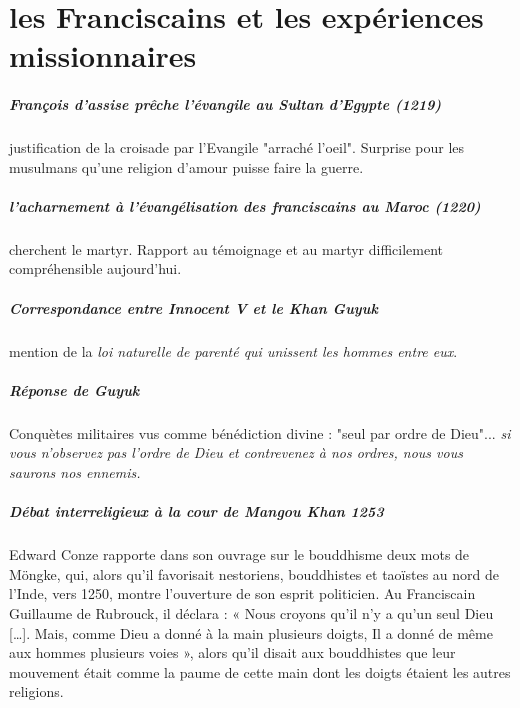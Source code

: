 \chapter{les Franciscains et les expériences missionnaires}



\paragraph{François d'assise prêche l'évangile au Sultan d'Egypte (1219)} justification de la croisade par l'Evangile "arraché l'oeil". Surprise pour les musulmans qu'une religion d'amour puisse faire la guerre.

\paragraph{l'acharnement à l'évangélisation des franciscains au Maroc (1220)} cherchent le martyr. Rapport au témoignage et au martyr difficilement compréhensible aujourd'hui.

\paragraph{Correspondance entre Innocent V et le Khan Guyuk}  mention de la \textit{loi naturelle de parenté qui unissent les hommes entre eux}. 

\paragraph{Réponse de Guyuk} Conquètes militaires vus comme bénédiction divine : "seul par ordre de Dieu"... \textit{si vous n'observez pas l'ordre de Dieu et contrevenez à nos ordres, nous vous saurons nos ennemis.}

\paragraph{Débat interreligieux à la cour de Mangou Khan 1253}  Edward Conze rapporte dans son ouvrage sur le bouddhisme deux mots de Möngke, qui, alors qu'il favorisait nestoriens, bouddhistes et taoïstes au nord de l'Inde, vers 1250, montre l'ouverture de son esprit politicien. Au Franciscain Guillaume de Rubrouck, il déclara : « Nous croyons qu'il n'y a qu'un seul Dieu […]. Mais, comme Dieu a donné à la main plusieurs doigts, Il a donné de même aux hommes plusieurs voies », alors qu'il disait aux bouddhistes que leur mouvement était comme la paume de cette main dont les doigts étaient les autres religions.


